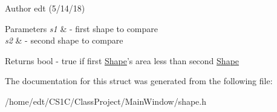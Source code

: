 \begin{DoxyAuthor}{Author}
edt (5/14/18)
\end{DoxyAuthor}

\begin{DoxyParams}{Parameters}
{\em s1} & -\/ first shape to compare \\
\hline
{\em s2} & -\/ second shape to compare\\
\hline
\end{DoxyParams}
\begin{DoxyReturn}{Returns}
bool -\/ true if first \hyperlink{classShape}{Shape}'s area less than second \hyperlink{classShape}{Shape} 
\end{DoxyReturn}


The documentation for this struct was generated from the following file\-:\begin{DoxyCompactItemize}
\item 
/home/edt/\-C\-S1\-C/\-Class\-Project/\-Main\-Window/shape.\-h\end{DoxyCompactItemize}

